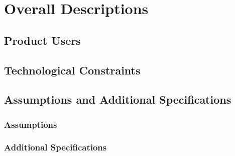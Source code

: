 \section{Overall Descriptions}
\subsection{Product Users}

\subsection{Technological Constraints}

\subsection{Assumptions and Additional Specifications}

\subsubsection{Assumptions}

\subsubsection{Additional Specifications}


